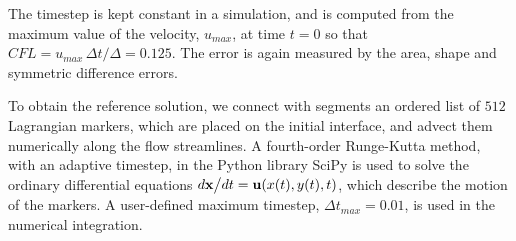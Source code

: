The timestep is kept constant in a simulation, and is computed from the maximum value of the velocity, $u_{max}$, at time $t=0$ so that $CFL = u_{max} \,\Delta t / \Delta = 0.125$. The error is again measured by the area, shape and symmetric difference errors.

To obtain the reference solution, we connect with segments an ordered list of $512$ Lagrangian markers, which are placed on the initial interface, and advect them numerically along the flow streamlines. A fourth-order Runge-Kutta method, with an adaptive timestep, in the Python library SciPy is used to solve the ordinary differential equations 
$d {\bf x} \big/ d t = {\bf u}(x(t), y(t), t)$, which describe the motion of the markers. A user-defined maximum timestep, $\Delta t_{max} = 0.01$, is used in the numerical integration.

